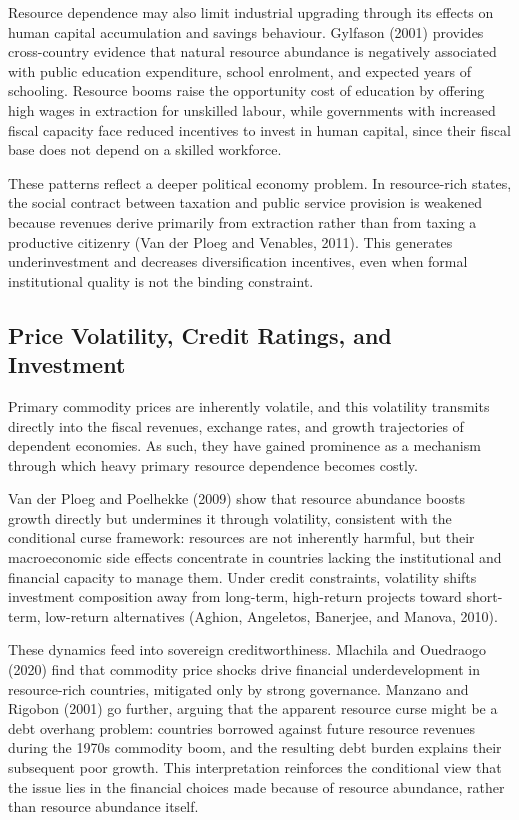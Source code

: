 \documentclass[12pt,a4paper]{report}
\begin{document}
Resource dependence may also limit industrial upgrading through its effects on human capital accumulation and savings behaviour. Gylfason (2001) provides cross-country evidence that natural resource abundance is negatively associated with public education expenditure, school enrolment, and expected years of schooling. Resource booms raise the opportunity cost of education by offering high wages in extraction for unskilled labour, while governments with increased fiscal capacity face reduced incentives to invest in human capital, since their fiscal base does not depend on a skilled workforce.

These patterns reflect a deeper political economy problem. In resource-rich states, the social contract between taxation and public service provision is weakened because revenues derive primarily from extraction rather than from taxing a productive citizenry (Van der Ploeg and Venables, 2011). This generates underinvestment and decreases diversification incentives, even when formal institutional quality is not the binding constraint.

\subsection{Price Volatility, Credit Ratings, and Investment}

Primary commodity prices are inherently volatile, and this volatility transmits directly into the fiscal revenues, exchange rates, and growth trajectories of dependent economies. As such, they have gained prominence as a mechanism through which heavy primary resource dependence becomes costly.

Van der Ploeg and Poelhekke (2009) show that resource abundance boosts growth directly but undermines it through volatility, consistent with the conditional curse framework: resources are not inherently harmful, but their macroeconomic side effects concentrate in countries lacking the institutional and financial capacity to manage them. Under credit constraints, volatility shifts investment composition away from long-term, high-return projects toward short-term, low-return alternatives (Aghion, Angeletos, Banerjee, and Manova, 2010).

These dynamics feed into sovereign creditworthiness. Mlachila and Ouedraogo (2020) find that commodity price shocks drive financial underdevelopment in resource-rich countries, mitigated only by strong governance. Manzano and Rigobon (2001) go further, arguing that the apparent resource curse might be a debt overhang problem: countries borrowed against future resource revenues during the 1970s commodity boom, and the resulting debt burden explains their subsequent poor growth. This interpretation reinforces the conditional view that the issue lies in the financial choices made because of resource abundance, rather than resource abundance itself.
\end{document}
